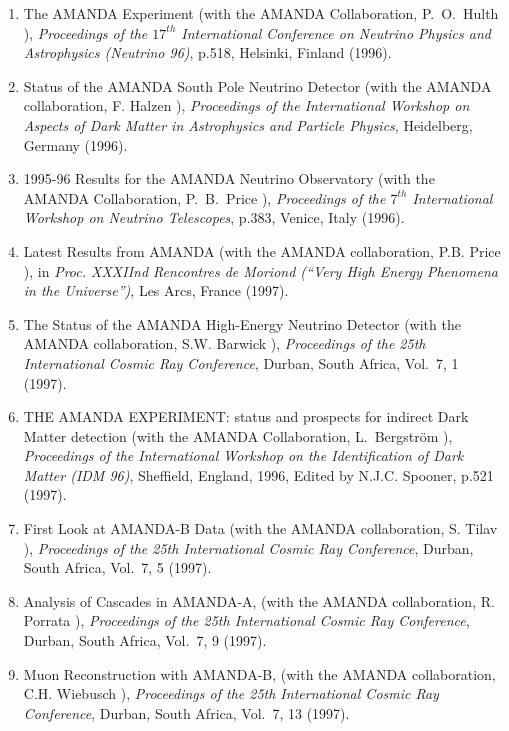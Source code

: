 \begin{enumerate}
\item The AMANDA Experiment (with the AMANDA Collaboration,
  P.~O.~Hulth \etal), {\it Proceedings of the $17^{th}$ International
    Conference on Neutrino Physics and Astrophysics (Neutrino 96)},
  p.518, Helsinki, Finland (1996).

\item Status of the AMANDA South Pole Neutrino Detector (with the
  AMANDA collaboration, F. Halzen \etal), {\it Proceedings of the
    International Workshop on Aspects of Dark Matter in Astrophysics
    and Particle Physics}, Heidelberg, Germany (1996).

\item 1995-96 Results for the AMANDA Neutrino Observatory (with the
  AMANDA Collaboration, P.~B.~Price \etal), {\it Proceedings of the
    $7^{th}$ International Workshop on Neutrino Telescopes}, p.383,
  Venice, Italy (1996).

\item Latest Results from AMANDA (with the AMANDA collaboration,
  P.B. Price \etal), in {\it Proc. XXXIInd Rencontres de Moriond
    (``Very High Energy Phenomena in the Universe'')}, Les Arcs,
  France (1997).

\item The Status of the AMANDA High-Energy Neutrino Detector (with the
  AMANDA collaboration, S.W. Barwick \etal), {\it Proceedings of the
    25th International Cosmic Ray Conference}, Durban, South Africa,
  Vol.~7, 1 (1997).

\item THE AMANDA EXPERIMENT: status and prospects for indirect Dark
  Matter detection (with the AMANDA Collaboration, L.~Bergstr\"{o}m
  \etal), {\it Proceedings of the International Workshop on the
    Identification of Dark Matter (IDM 96)}, Sheffield, England, 1996,
  Edited by N.J.C. Spooner, p.521 (1997).


\item First Look at AMANDA-B Data (with the AMANDA collaboration,
  S. Tilav \etal), {\it Proceedings of the 25th International Cosmic
    Ray Conference}, Durban, South Africa, Vol.~7, 5 (1997).

\item Analysis of Cascades in AMANDA-A, (with the AMANDA
  collaboration, R. Porrata \etal), {\it Proceedings of the 25th
    International Cosmic Ray Conference}, Durban, South Africa,
  Vol.~7, 9 (1997).

\item Muon Reconstruction with AMANDA-B, (with the AMANDA
  collaboration, C.H. Wiebusch \etal), {\it Proceedings of the 25th
    International Cosmic Ray Conference}, Durban, South Africa,
  Vol.~7, 13 (1997).


\end{enumerate}
